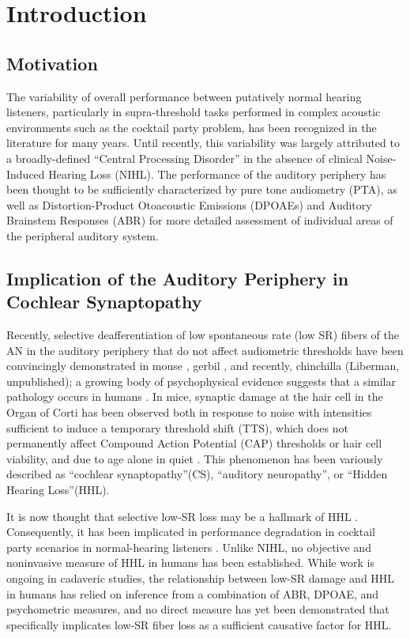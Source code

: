 \chapter{Introduction}
\label{chapter:Introduction}
\thispagestyle{myheadings}
\section{Motivation}
The variability of overall performance between putatively normal hearing listeners, particularly in supra-threshold tasks performed in complex acoustic environments such as the cocktail party problem, has been recognized in the literature for many years\cite{Cherry1953Some}.  Until recently, this variability was largely attributed to a broadly-defined ``Central Processing Disorder'' in the absence of clinical Noise-Induced Hearing Loss (NIHL). The performance of the auditory periphery has been thought to be sufficiently characterized by pure tone audiometry (PTA), as well as Distortion-Product Otoacoustic Emissions (DPOAEs) and Auditory Brainstem Responses (ABR) for more detailed assessment of individual areas of the peripheral auditory system.

\section{Implication of the Auditory Periphery in Cochlear Synaptopathy}
Recently, selective deafferentiation of low spontaneous rate (low SR) fibers of the AN in the auditory periphery that do not affect audiometric thresholds have been convincingly demonstrated in mouse \citep{Kujawa2009Adding}, gerbil \citep{Furman2013NoiseInduced}, and recently, chinchilla (Liberman, unpublished); a growing body of psychophysical evidence suggests that a similar pathology occurs in humans \citep{Bharadwaj2015Individual}.  In mice, synaptic damage at the hair cell in the Organ of Corti has been observed both in response to noise with intensities sufficient to induce a temporary threshold shift (TTS), which does not permanently affect Compound Action Potential (CAP) thresholds or hair cell viability, and due to age alone in quiet \citep{Sergeyenko2013AgeRelated,Fernandez2015Aging}. This phenomenon has been variously described as ``cochlear synaptopathy''(CS)\citep{Bharadwaj2014Cochlear}, ``auditory neuropathy'', or ``Hidden Hearing Loss''(HHL).  

It is now thought that selective low-SR loss may be a hallmark of HHL \citep{Furman2013NoiseInduced,Bharadwaj2014Cochlear,Bharadwaj2015Individual,Schaette2011Tinnitus}. Consequently, it has been implicated in performance degradation in cocktail party scenarios in normal-hearing listeners \citep{Bharadwaj2015Individual,Bharadwaj2014Cochlear}.  Unlike NIHL, no objective and noninvasive measure of HHL in humans has been established.  While work is ongoing in cadaveric studies, the relationship between low-SR damage and HHL in humans has relied on inference from a combination of ABR, DPOAE, and psychometric measures, and no direct measure has yet been demonstrated that specifically implicates low-SR fiber loss as a sufficient causative factor for HHL.

